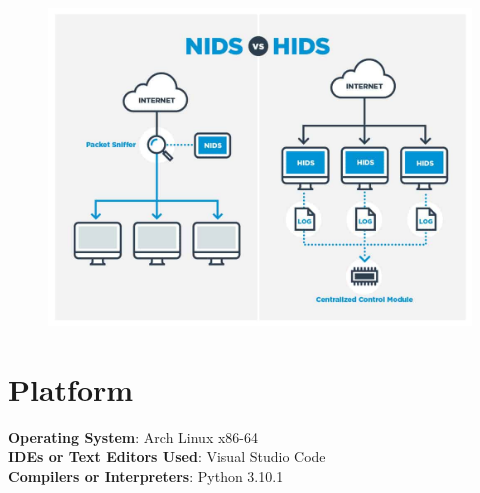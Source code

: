\documentclass[openany]{book}
\begin{document}
\begin{figure}[H]
    \centering
    \includegraphics[width=.85\textwidth]{NIDS-vs-HIDS.jpg}
\end{figure}
\section{Platform}
\textbf{Operating System}: Arch Linux x86-64 \\
\textbf{IDEs or Text Editors Used}: Visual Studio Code\\
\textbf{Compilers or Interpreters}: Python 3.10.1\\
\end{document}
